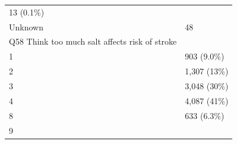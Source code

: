 \documentclass[]{article}
\begin{document}
\begin{longtable}[]{@{}ll@{}}
\begin{minipage}[t]{0.23\columnwidth}
13 (0.1\%)\strut
\end{minipage}\tabularnewline
\begin{minipage}[t]{0.71\columnwidth}\raggedright
Unknown\strut
\end{minipage} & \begin{minipage}[t]{0.23\columnwidth}\raggedright
48\strut
\end{minipage}\tabularnewline
\begin{minipage}[t]{0.71\columnwidth}\raggedright
Q58 Think too much salt affects risk of stroke\strut
\end{minipage} & \begin{minipage}[t]{0.23\columnwidth}\raggedright
\strut
\end{minipage}\tabularnewline
\begin{minipage}[t]{0.71\columnwidth}\raggedright
1\strut
\end{minipage} & \begin{minipage}[t]{0.23\columnwidth}\raggedright
903 (9.0\%)\strut
\end{minipage}\tabularnewline
\begin{minipage}[t]{0.71\columnwidth}\raggedright
2\strut
\end{minipage} & \begin{minipage}[t]{0.23\columnwidth}\raggedright
1,307 (13\%)\strut
\end{minipage}\tabularnewline
\begin{minipage}[t]{0.71\columnwidth}\raggedright
3\strut
\end{minipage} & \begin{minipage}[t]{0.23\columnwidth}\raggedright
3,048 (30\%)\strut
\end{minipage}\tabularnewline
\begin{minipage}[t]{0.71\columnwidth}\raggedright
4\strut
\end{minipage} & \begin{minipage}[t]{0.23\columnwidth}\raggedright
4,087 (41\%)\strut
\end{minipage}\tabularnewline
\begin{minipage}[t]{0.71\columnwidth}\raggedright
8\strut
\end{minipage} & \begin{minipage}[t]{0.23\columnwidth}\raggedright
633 (6.3\%)\strut
\end{minipage}\tabularnewline
\begin{minipage}[t]{0.71\columnwidth}\raggedright
9\strut
\end{minipage} & \begin{minipage}[t]{0.23\columnwidth}\raggedright

\end{minipage}
\end{longtable}
\end{document}
